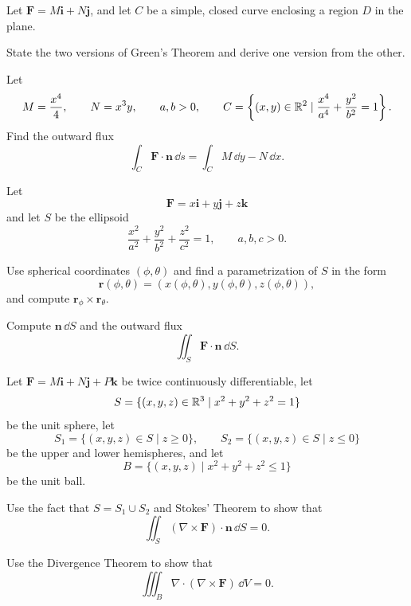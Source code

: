 \begin{problem}
Let $\mathbf F=M\mathbf i+N\mathbf j$, and let $C$ be a simple, closed curve enclosing a region $D$ in the plane.
\begin{problemsubparts}
\item State the two versions of Green's Theorem and derive one version from the other.
\item Let
\[
M=\frac{x^4}{4},
\qquad
N=x^3y,
\qquad a, b>0,
\qquad
C=\left\{(x, y)\in\mathbb{R}^2\mid \frac{x^4}{a^4}+\frac{y^2}{b^2}=1\right\}.
\]
Find the outward flux
\[
\int_C\mathbf F\cdot\mathbf n\,\dd s
=
\int_C M\,\dd y-N\,\dd x.
\]
\end{problemsubparts}
\end{problem}

\begin{problem}
Let
\[
\mathbf F=x\mathbf i+y\mathbf j+z\mathbf k
\]
and let $S$ be the ellipsoid
\[
\frac{x^2}{a^2}+\frac{y^2}{b^2}+\frac{z^2}{c^2}=1,
\qquad a, b, c>0.
\]
\begin{problemsubparts}
\item Use spherical coordinates $(\phi, \theta)$ and find a parametrization of $S$ in the form
\[
\mathbf r(\phi, \theta)
=(x(\phi, \theta), y(\phi, \theta), z(\phi, \theta)),
\]
and compute $\mathbf r_\phi\times\mathbf r_\theta$.
\item Compute $\mathbf n\,\dd S$ and the outward flux
\[
\iint_S\mathbf F\cdot\mathbf n\,\dd S.
\]
\end{problemsubparts}
\end{problem}

\begin{problem}
Let $\mathbf F=M\mathbf i+N\mathbf j+P\mathbf k$ be twice continuously differentiable, let
\[
S=\{(x, y, z)\in\mathbb{R}^3\mid x^2+y^2+z^2=1\}
\]
be the unit sphere, let
\[
S_1=\{(x, y, z)\in S\mid z\ge0\},
\qquad
S_2=\{(x, y, z)\in S\mid z\le0\}
\]
be the upper and lower hemispheres, and let
\[
B=\{(x, y, z)\mid x^2+y^2+z^2\le1\}
\]
be the unit ball.
\begin{problemsubparts}
\item Use the fact that $S=S_1\cup S_2$ and Stokes' Theorem to show that
\[
\iint_S(\nabla\times\mathbf F)\cdot\mathbf n\,\dd S=0.
\]
\item Use the Divergence Theorem to show that
\[
\iiint_B\nabla\cdot(\nabla\times\mathbf F)\,\dd V=0.
\]
\end{problemsubparts}
\end{problem}

